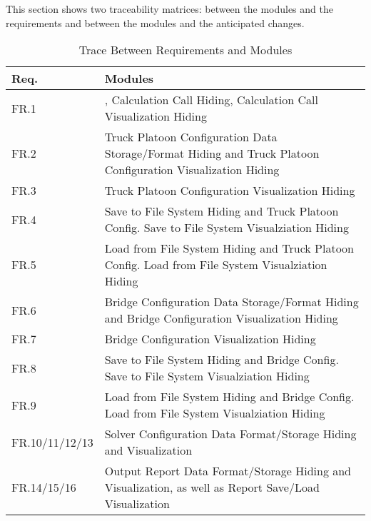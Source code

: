 \documentclass[12pt, titlepage]{article}
\begin{document}
This section shows two traceability matrices: between the modules and the
requirements and between the modules and the anticipated changes.

\begin{table}[H]
\centering
\begin{tabular}{p{} p{}}
\toprule
\textbf{Req.} & \textbf{Modules}\\
\midrule
FR.1 & , Calculation Call Hiding, Calculation Call Visualization Hiding\\
FR.2 & Truck Platoon Configuration Data Storage/Format Hiding and Truck Platoon Configuration Visualization Hiding\\
FR.3 & Truck Platoon Configuration Visualization Hiding\\
FR.4 & Save to File System Hiding and Truck Platoon Config. Save to File System Visualziation Hiding\\
FR.5 & Load from File System Hiding and Truck Platoon Config. Load from File System Visualziation Hiding\\
FR.6 & Bridge Configuration Data Storage/Format Hiding and Bridge Configuration Visualization Hiding\\
FR.7 & Bridge Configuration Visualization Hiding\\
FR.8 & Save to File System Hiding and Bridge Config. Save to File System Visualziation Hiding\\
FR.9 & Load from File System Hiding and Bridge Config. Load from File System Visualziation Hiding\\
FR.10/11/12/13 & Solver Configuration Data Format/Storage Hiding and Visualization\\
FR.14/15/16 & Output Report Data Format/Storage Hiding and Visualization, as well as Report Save/Load Visualization\\
\bottomrule
\end{tabular}
\caption{Trace Between Requirements and Modules}
\label{TblRT}
\end{table}
\end{document}
